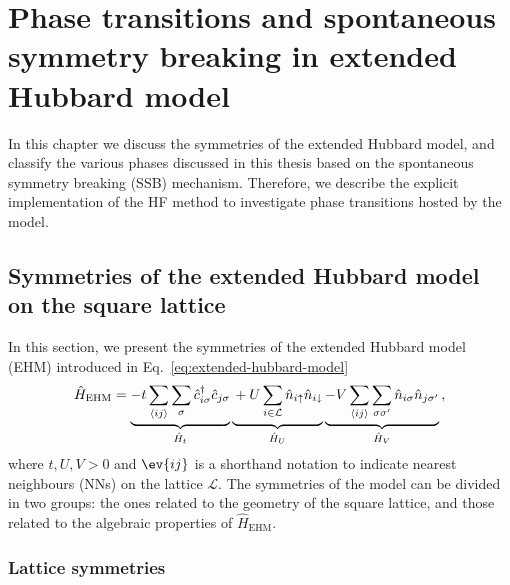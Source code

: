  \def\GraphicsFolder{chapters/ehm-symmetries/pictures}
\chapter{Phase transitions and spontaneous symmetry breaking in extended Hubbard model}\label{chap:ehm-symmetries}

In this chapter we discuss the symmetries of the extended Hubbard model, and classify the various phases discussed in this thesis based on the spontaneous symmetry breaking (SSB) mechanism. Therefore, we describe the explicit implementation of the HF method to investigate phase transitions hosted by the model.

\section{Symmetries of the extended Hubbard model on the square lattice}\label{sec:ehm-syms}

In this section, we present the symmetries of the extended Hubbard model (EHM) introduced in Eq.~\eqref{eq:extended-hubbard-model}
\[
	\hat H_\mathrm{EHM} =
	\underbrace{
		-t \sum_{\langle ij \rangle} \sum_\sigma \hat c_{i\sigma}^\dagger \hat c_{j\sigma}
	}_{\hat H_t}
	\underbrace{
		\vphantom{\sum_{\langle ij \rangle}}
		+ U \sum_{i\in\mathcal{L}} \hat n_{i\uparrow} \hat n_{i\downarrow}
	}_{\hat H_U}
	\underbrace{
		- V \sum_{\langle ij \rangle} \sum_{\sigma \sigma'} \hat n_{i\sigma} \hat n_{j\sigma'}
	}_{\hat H_V} \, ,
\]
where $t,U,V > 0$ and $\ev{ij}$ is a shorthand notation to indicate nearest neighbours (NNs) on the lattice $\mathcal{L}$. The symmetries of the model can be divided in two groups: the ones related to the geometry of the square lattice, and those related to the algebraic properties of $\hat H_\mathrm{EHM}$.

\subsection{Lattice symmetries}\label{subsec:lattice-syms}

